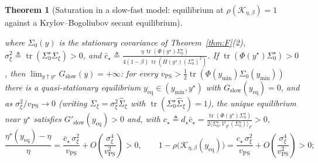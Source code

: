 \documentclass[11pt]{article}
\newtheorem{theorem}{Theorem}
\theoremstyle{remark}
\newcommand{\tr}{\operatorname{tr}}
\begin{document}
\begin{theorem}[Saturation in a slow-fast model: equilibrium at $\rho(\mathcal K_{\eta,\beta})=1$ against a Krylov--Bogoliubov secant equilibrium]
\begin{enumerate}
where $\Sigma_0(y)$ is the stationary covariance of Theorem~\ref{thm:F}(2), $\sigma_\xi^2\triangleq\tr(\Sigma_0^\star\Sigma_\xi)>0$, and $\bar c_\star\triangleq\frac{\eta\,\tr(\Phi(y^\star)\Sigma_0^\star)}{4(1-\beta)\,\tr(H(y^\star)(\Sigma_0^\star)^2)}$. If $\tr(\Phi(y^\star)\Sigma_0^\star)>0$, then $\lim_{y\uparrow y^\star}G_{\mathrm{slow}}(y)=+\infty$: for every $v_{\mathrm{PS}}>\frac12\tr(\Phi(y_{\min})\Sigma_0(y_{\min}))$ there is a quasi-stationary equilibrium $y_{\mathrm{eq}}\in(y_{\min},y^\star)$ with $G_{\mathrm{slow}}(y_{\mathrm{eq}})=0$, and as $\sigma_\xi^2/v_{\mathrm{PS}}\to0$ (writing $\Sigma_\xi=\sigma_\xi^2\widehat\Sigma_\xi$ with $\tr(\Sigma_0^\star\widehat\Sigma_\xi)=1$), the unique equilibrium near $y^\star$ satisfies $G'_{\mathrm{slow}}(y_{\mathrm{eq}})>0$ and, with $c_\star\triangleq d_\star\bar c_\star=\frac{\tr(\Phi(y^\star)\Sigma_0^\star)}{2\langle\Sigma_0^\star,\mathcal V_{y^\star}(\Sigma_0^\star)\rangle_F}>0$,
\begin{equation}\label{eq:saturation-law}
\frac{\eta^\star(y_{\mathrm{eq}})-\eta}{\eta}=\frac{\bar c_\star\,\sigma_\xi^2}{v_{\mathrm{PS}}}+O\!\left(\frac{\sigma_\xi^4}{v_{\mathrm{PS}}^2}\right)>0,\qquad
1-\rho\big(\mathcal K_{\eta,\beta}(y_{\mathrm{eq}})\big)=\frac{c_\star\,\sigma_\xi^2}{v_{\mathrm{PS}}}+O\!\left(\frac{\sigma_\xi^4}{v_{\mathrm{PS}}^2}\right)>0;
\end{equation}

\end{enumerate}
\end{theorem}
\end{document}
